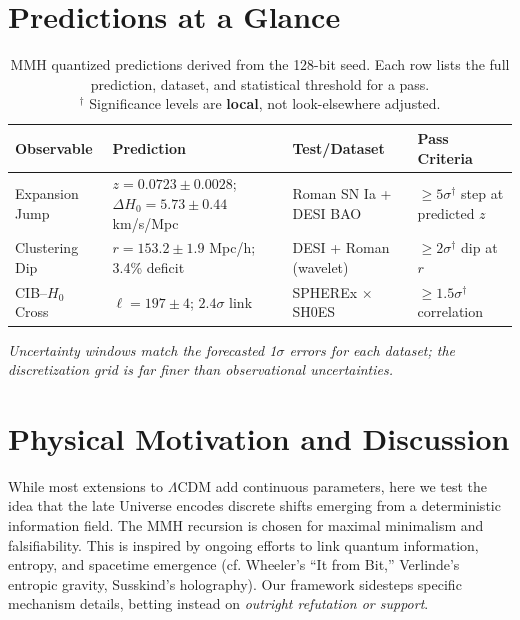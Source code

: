 \documentclass[11pt,a4paper]{article}
\begin{document}
\section{Predictions at a Glance}

\FloatBarrier
\begin{table}[htbp]
\centering
\begin{tabular}{p{3.2cm} p{4.2cm} p{3.5cm} p{3.8cm}}
\hline
\textbf{Observable} & \textbf{Prediction} & \textbf{Test/Dataset} & \textbf{Pass Criteria} \\
\hline
Expansion Jump   & $z = 0.0723 \pm 0.0028$; $\Delta H_0 = 5.73 \pm 0.44$ km/s/Mpc & Roman SN Ia + DESI BAO & $\geq 5\sigma^\dagger$ step at predicted $z$ \\
Clustering Dip   & $r = 153.2 \pm 1.9$ Mpc/h; 3.4\% deficit & DESI + Roman (wavelet) & $\geq 2\sigma^\dagger$ dip at $r$ \\
CIB--$H_0$ Cross & $\ell = 197 \pm 4$; $2.4\sigma$ link & SPHEREx $\times$ SH0ES & $\geq 1.5\sigma^\dagger$ correlation \\
\hline
\end{tabular}
\caption{MMH quantized predictions derived from the 128-bit seed. Each row lists the full prediction, dataset, and statistical threshold for a pass.\\
\footnotesize $^\dagger$ Significance levels are \textbf{local}, not look-elsewhere adjusted.}
\label{tab:predictions}
\end{table}
\FloatBarrier

\noindent\textit{Uncertainty windows match the forecasted 1$\sigma$ errors for each dataset; the discretization grid is far finer than observational uncertainties.}

\FloatBarrier
\section{Physical Motivation and Discussion}
While most extensions to $\Lambda$CDM add continuous parameters, here we test the idea that the late Universe encodes discrete shifts emerging from a deterministic information field. The MMH recursion is chosen for maximal minimalism and falsifiability. This is inspired by ongoing efforts to link quantum information, entropy, and spacetime emergence (cf. Wheeler's ``It from Bit,'' Verlinde's entropic gravity, Susskind's holography). Our framework sidesteps specific mechanism details, betting instead on \emph{outright refutation or support}.
\end{document}
